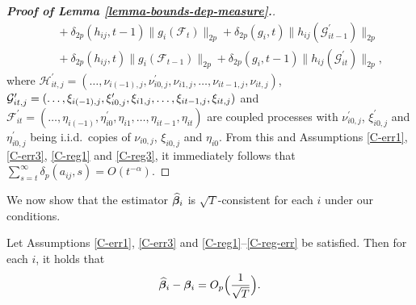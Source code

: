 \documentclass[12pt]{article}
\begin{document}
\begin{proof}[\textnormal{\textbf{Proof of Lemma \ref{lemma-bounds-dep-measure}.}}]
\begin{align*}
&\quad + \delta_{2p}(h_{ij}, t-1) \| g_i(\mathcal{F}_t) \|_{2p} + \delta_{2p} (g_i, t) \| h_{ij}(\mathcal{G}_{it-1}^\prime) \|_{2p} \\
&\quad + \delta_{2p}(h_{ij}, t) \| g_i(\mathcal{F}_{t-1}) \|_{2p} + \delta_{2p} (g_i, t-1) \| h_{ij}(\mathcal{G}_{it}^\prime) \|_{2p}, 
\end{align*}
where $\mathcal{H}_{it,j}^\prime  = (\ldots, \nu_{i(-1),j}, \nu^\prime_{i0,j}, \nu_{i1,j}, \ldots, \nu_{it-1,j}, \nu_{it,j})$, $\mathcal{G}_{it,j}^\prime  = (\ldots, \xi_{i(-1),j}, \xi^\prime_{i0,j}, \xi_{i1,j}, \ldots, \linebreak \xi_{it-1,j}, \xi_{it,j})$ and $\mathcal{F}_{it}^\prime  = (\ldots, \eta_{i(-1)}, \eta^\prime_{i0}, \eta_{i1}, \ldots, \eta_{it-1}, \eta_{it})$ are coupled processes with $\nu_{i0,j}^\prime$, $\xi_{i0,j}^\prime$ and $\eta_{i0,j}^\prime$ being i.i.d.\ copies of $\nu_{i0,j}$, $\xi_{i0,j}$ and $\eta_{i0}$. From this and Assumptions \ref{C-err1}, \ref{C-err3}, \ref{C-reg1} and \ref{C-reg3}, it immediately follows that $\sum_{s=t}^\infty \delta_p(a_{ij}, s) = O(t^{-\alpha})$.
\end{proof}


We now show that the estimator $\widehat{\bm{\beta}}_i$ is $\sqrt{T}$-consistent for each $i$ under our conditions.


\begin{lemmaA}\label{lemma-beta-rate}
Let Assumptions \ref{C-err1}, \ref{C-err3} and \ref{C-reg1}--\ref{C-reg-err} be satisfied. Then for each $i$, it holds that
\[ \widehat{\bm{\beta}}_i - \bm{\beta}_i = O_p\Big(\frac{1}{\sqrt{T}}\Big). \]
\end{lemmaA}
\end{document}
